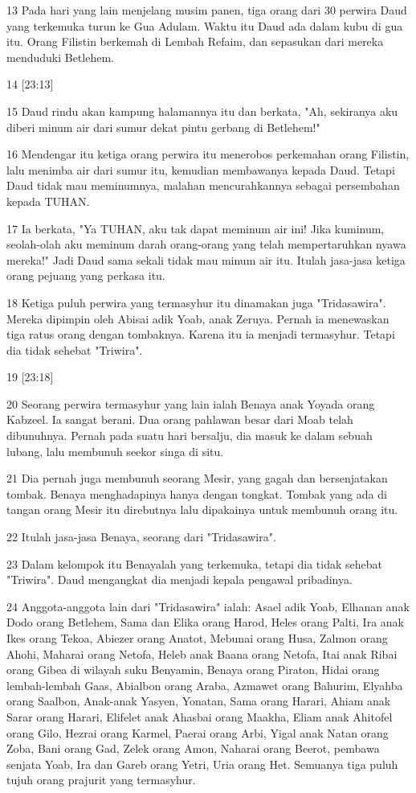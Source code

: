 \par 13 Pada hari yang lain menjelang musim panen, tiga orang dari 30 perwira Daud yang terkemuka turun ke Gua Adulam. Waktu itu Daud ada dalam kubu di gua itu. Orang Filistin berkemah di Lembah Refaim, dan sepasukan dari mereka menduduki Betlehem.
\par 14 [23:13]
\par 15 Daud rindu akan kampung halamannya itu dan berkata, "Ah, sekiranya aku diberi minum air dari sumur dekat pintu gerbang di Betlehem!"
\par 16 Mendengar itu ketiga orang perwira itu menerobos perkemahan orang Filistin, lalu menimba air dari sumur itu, kemudian membawanya kepada Daud. Tetapi Daud tidak mau meminumnya, malahan mencurahkannya sebagai persembahan kepada TUHAN.
\par 17 Ia berkata, "Ya TUHAN, aku tak dapat meminum air ini! Jika kuminum, seolah-olah aku meminum darah orang-orang yang telah mempertaruhkan nyawa mereka!" Jadi Daud sama sekali tidak mau minum air itu. Itulah jasa-jasa ketiga orang pejuang yang perkasa itu.
\par 18 Ketiga puluh perwira yang termasyhur itu dinamakan juga "Tridasawira". Mereka dipimpin oleh Abisai adik Yoab, anak Zeruya. Pernah ia menewaskan tiga ratus orang dengan tombaknya. Karena itu ia menjadi termasyhur. Tetapi dia tidak sehebat "Triwira".
\par 19 [23:18]
\par 20 Seorang perwira termasyhur yang lain ialah Benaya anak Yoyada orang Kabzeel. Ia sangat berani. Dua orang pahlawan besar dari Moab telah dibunuhnya. Pernah pada suatu hari bersalju, dia masuk ke dalam sebuah lubang, lalu membunuh seekor singa di situ.
\par 21 Dia pernah juga membunuh seorang Mesir, yang gagah dan bersenjatakan tombak. Benaya menghadapinya hanya dengan tongkat. Tombak yang ada di tangan orang Mesir itu direbutnya lalu dipakainya untuk membunuh orang itu.
\par 22 Itulah jasa-jasa Benaya, seorang dari "Tridasawira".
\par 23 Dalam kelompok itu Benayalah yang terkemuka, tetapi dia tidak sehebat "Triwira". Daud mengangkat dia menjadi kepala pengawal pribadinya.
\par 24 Anggota-anggota lain dari "Tridasawira" ialah: Asael adik Yoab, Elhanan anak Dodo orang Betlehem, Sama dan Elika orang Harod, Heles orang Palti, Ira anak Ikes orang Tekoa, Abiezer orang Anatot, Mebunai orang Husa, Zalmon orang Ahohi, Maharai orang Netofa, Heleb anak Baana orang Netofa, Itai anak Ribai orang Gibea di wilayah suku Benyamin, Benaya orang Piraton, Hidai orang lembah-lembah Gaas, Abialbon orang Araba, Azmawet orang Bahurim, Elyahba orang Saalbon, Anak-anak Yasyen, Yonatan, Sama orang Harari, Ahiam anak Sarar orang Harari, Elifelet anak Ahasbai orang Maakha, Eliam anak Ahitofel orang Gilo, Hezrai orang Karmel, Paerai orang Arbi, Yigal anak Natan orang Zoba, Bani orang Gad, Zelek orang Amon, Naharai orang Beerot, pembawa senjata Yoab, Ira dan Gareb orang Yetri, Uria orang Het. Semuanya tiga puluh tujuh orang prajurit yang termasyhur.

